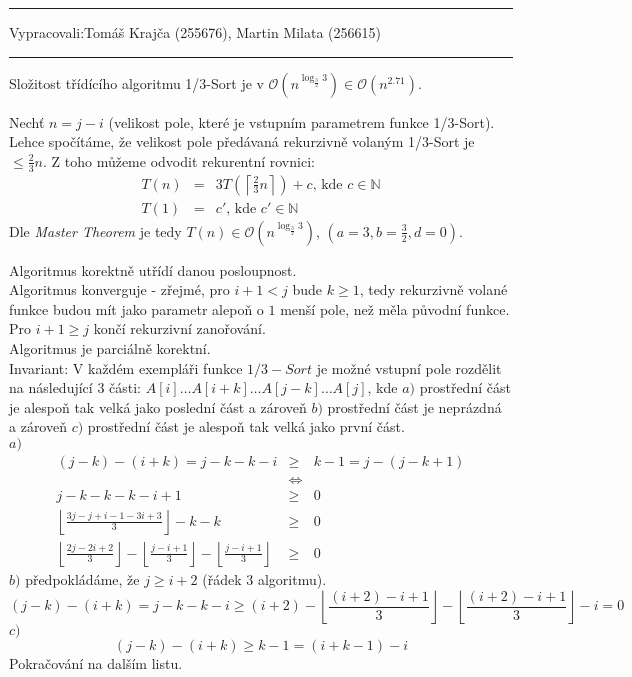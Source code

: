 \documentclass[12pt]{article}
\newcommand{\zadani}[2]{
{\large
\noindent {\bf IB108 \hfill{} Sada #1, Příklad #2 \\[-4mm]}
\noindent\hrule
\vspace{2mm}
\noindent Vypracovali:\hfill{}Tomáš Krajča (255676), Martin Milata (256615)
\vspace{3mm}
\hrule
\bigskip\bigskip}
}
\begin{document}
\zadani{1}{1}

\noindent
Složitost třídícího algoritmu 1/3-Sort je v
$\mathcal{O}\left(n^{\log_{\frac{3}{2}}3}\right) \in
\mathcal{O}\left(n^{2.71}\right)$.

Nechť $n = j-i$ (velikost pole, které je vstupním parametrem funkce 1/3-Sort).
Lehce spočítáme, že velikost pole předávaná rekurzivně volaným 1/3-Sort je 
 $\le \frac{2}{3}n$. Z toho můžeme odvodit rekurentní rovnici:
\begin{eqnarray*}
T(n) & = & 3T\left(\left\lceil \frac{2}{3}n\right\rceil\right) + c\mbox{, kde }c \in
\mathbb{N}\\
T(1) & = & c'\mbox{, kde }c' \in \mathbb{N}
\end{eqnarray*}
Dle \textit{Master Theorem} je tedy $T(n) \in
\mathcal{O}\left(n^{\log_{\frac{3}{2}}3}\right)$, $(a = 3, b = \frac{3}{2}, d =
0)$.

Algoritmus korektně utřídí danou posloupnost.\\
Algoritmus konverguje - zřejmé, pro $i + 1 < j$ bude $k \ge 1$, tedy rekurzivně
volané funkce budou mít jako parametr alepoň o $1$ menší pole, než měla
původní funkce. Pro $i + 1 \ge j$ končí rekurzivní zanořování.\\
Algoritmus je parciálně korektní. \\
Invariant: V každém exempláři funkce $1/3-Sort$ je možné vstupní pole rozdělit
na následující $3$ části: $A[i]\dots A[i+k] \dots A[j-k] \dots A[j]$, kde $a)$
prostřední část je alespoň tak velká jako poslední část a zároveň $b)$ prostřední
část je neprázdná a zároveň $c)$ prostřední část je alespoň tak velká jako
první část.\\
$a)$
\begin{eqnarray*}
(j-k)-(i+k) =
j-k-k-i &\ge& k - 1  =
 j-(j-k+1)\\
 &\Longleftrightarrow&\\
 j-k-k-k-i+1 &\ge& 0\\
\left\lfloor\frac{3j-j+i-1-3i+3}{3}\right\rfloor -k -k &\ge& 0\\
 \left\lfloor\frac{2j-2i+2}{3}\right\rfloor
 -\left\lfloor\frac{j-i+1}{3}\right\rfloor -
 \left\lfloor\frac{j-i+1}{3}\right\rfloor &\ge& 0
\end{eqnarray*}
$b)$ předpokládáme, že $j\ge i+2$ (řádek $3$ algoritmu).
$$(j-k)-(i+k) = j-k-k-i \ge
(i+2)-\left\lfloor \frac{(i+2)-i+1}{3} \right\rfloor -\left\lfloor \frac{(i+2)-i+1}{3} \right\rfloor- i =
 0$$
 $c)$\\
 $$(j-k)-(i+k) \ge k-1 = (i+k-1)-i$$
 Pokračování na dalším listu.
 
\end{document}
